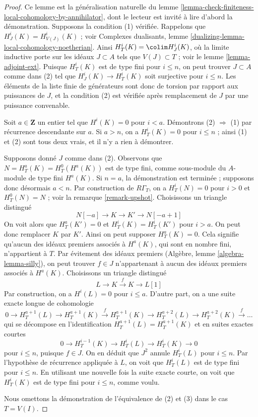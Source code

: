 \begin{proof}
Ce lemme est la généralisation naturelle du lemme \ref{lemma-check-finiteness-local-cohomology-by-annihilator}, dont le lecteur est invité à lire d'abord la démonstration. Supposons la condition (1) vérifiée. Rappelons que $H^i_J(K) = H^i_{V(J)}(K)$ ; voir Complexes dualisants, lemme \ref{dualizing-lemma-local-cohomology-noetherian}. Ainsi $H^i_T(K) = \colim H^i_J(K)$, où la limite inductive porte sur les idéaux $J \subset A$ tels que $V(J) \subset T$ ; voir le lemme \ref{lemma-adjoint-ext}. Puisque $H^i_T(K)$ est de type fini pour $i \leq n$, on peut trouver $J \subset A$ comme dans (2) tel que $H^i_J(K) \to H^i_T(K)$ soit surjective pour $i \leq n$. Les éléments de la liste finie de générateurs sont donc de torsion par rapport aux puissances de $J$, et la condition (2) est vérifiée après remplacement de $J$ par une puissance convenable.

\medskip\noindent
Soit $a \in \mathbf{Z}$ un entier tel que $H^i(K) = 0$ pour $i < a$. Démontrons (2) $\Rightarrow$ (1) par récurrence descendante sur $a$. Si $a > n$, on a $H^i_T(K) = 0$ pour $i \leq n$ ; ainsi (1) et (2) sont tous deux vrais, et il n'y a rien à démontrer.

\medskip\noindent
Supposons donné $J$ comme dans (2). Observons que $N = H^a_T(K) = H^0_T(H^a(K))$ est de type fini, comme sous-module du $A$-module de type fini $H^a(K)$. Si $n = a$, la démonstration est terminée ; supposons donc désormais $a < n$. Par construction de $R\Gamma_T$, on a $H^i_T(N) = 0$ pour $i > 0$ et $H^0_T(N) = N$ ; voir la remarque \ref{remark-upshot}. Choisissons un triangle distingué
$$
N[-a] \to K \to K' \to N[-a + 1]
$$
On voit alors que $H^a_T(K') = 0$ et $H^i_T(K) = H^i_T(K')$ pour $i > a$. On peut donc remplacer $K$ par $K'$. Ainsi on peut supposer $H^a_T(K) = 0$. Cela signifie qu'aucun des idéaux premiers associés à $H^a(K)$, qui sont en nombre fini, n'appartient à $T$. Par évitement des idéaux premiers (Algèbre, lemme \ref{algebra-lemma-silly}), on peut trouver $f \in J$ n'appartenant à aucun des idéaux premiers associés à $H^a(K)$. Choisissons un triangle distingué
$$
L \to K \xrightarrow{f} K \to L[1]
$$
Par construction, on a $H^i(L) = 0$ pour $i \leq a$. D'autre part, on a une suite exacte longue de cohomologie
$$
0 \to H^{a + 1}_T(L) \to H^{a + 1}_T(K) \xrightarrow{f}
H^{a + 1}_T(K) \to H^{a + 2}_T(L) \to H^{a + 2}_T(K) \xrightarrow{f} \ldots
$$
qui se décompose en l'identification $H^{a + 1}_T(L) = H^{a + 1}_T(K)$ et en suites exactes courtes
$$
0 \to H^{i - 1}_T(K) \to H^i_T(L) \to H^i_T(K) \to 0
$$
pour $i \leq n$, puisque $f \in J$. On en déduit que $J^2$ annule $H^i_T(L)$ pour $i \leq n$. Par l'hypothèse de récurrence appliquée à $L$, on voit que $H^i_T(L)$ est de type fini pour $i \leq n$. En utilisant une nouvelle fois la suite exacte courte, on voit que $H^i_T(K)$ est de type fini pour $i \leq n$, comme voulu.

\medskip\noindent
Nous omettons la démonstration de l'équivalence de (2) et (3) dans le cas $T = V(I)$.
\end{proof}

